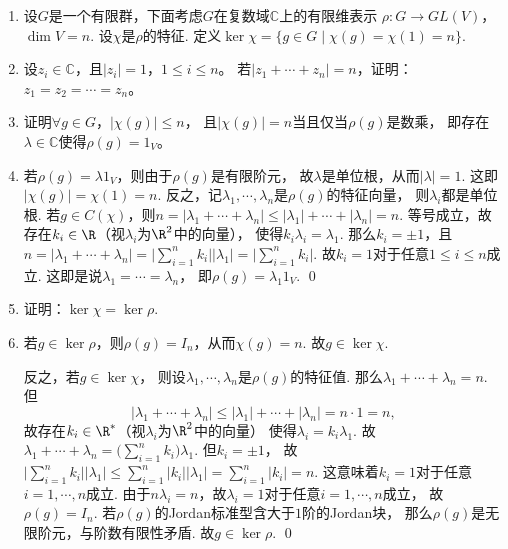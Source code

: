\begin{enumerate}
    \item[11.5] 设$G$是一个有限群，下面考虑$G$在复数域$\mathbb{C}$上的有限维表示
    $\rho:G \rightarrow GL(V)$，$\dim V = n$.
    设$\chi$是$\rho$的特征. 
    定义$\ker \chi = \{g \in G \mid \chi(g) = \chi(1) = n\}$.
    \item[(i)] 设$z_i\in\mathbb{C}$，且$|z_i|=1$，$1\le i\le n$。
        若$|z_1+\cdots+z_n|=n$，证明：$z_1=z_2=\cdots=z_n$。
    \item[(ii)] 证明$\forall g\in G$，$|\chi(g)|\le n$，
        且$|\chi(g)|=n$当且仅当$\rho(g)$是数乘，
        即存在$\lambda\in\mathbb{C}$使得$\rho(g)=1_V$。
    \item[\textbf{证明:}]
        若$\rho(g)=\lambda 1_{V}$，则由于$\rho(g)$是有限阶元，
        故$\lambda$是单位根，从而$|\lambda|=1$. 这即$|\chi(g)|=\chi(1)=n$.
        反之，记$\lambda_{1},\cdots,\lambda_{n}$是$\rho(g)$的特征向量，
        则$\lambda_{i}$都是单位根.
        若$g \in C(\chi)$，则$n = |\lambda_{1}+\cdots+\lambda_{n}|
        \leq |\lambda_{1}|+\cdots+|\lambda_{n}| = n$.
        等号成立，故存在$k_{i} \in \R$（视$\lambda_{i}$为$\R^{2}$中的向量），
        使得$k_{i}\lambda_{i}=\lambda_{1}$.
        那么$k_{i}=\pm 1$，且$n = |\lambda_{1}+\cdots+\lambda_{n}| 
        = \Big|\sum\limits_{i=1}^{n}k_{i}\Big||\lambda_{1}| 
        = \Big|\sum\limits_{i=1}^{n}k_{i}\Big|$.
        故$k_{i}=1$对于任意$1 \leq i \leq n$成立. 
        这即是说$\lambda_{1}=\cdots=\lambda_{n}$，
        即$\rho(g) = \lambda_{1}1_{V}$. \qed
    \item[(iii)] 证明：$\ker \chi = \ker \rho$.
    \item[\textbf{证明:}]
        若$g \in \ker\rho$，则$\rho(g)=I_{n}$，从而$\chi(g) = n$.
        故$g \in \ker\chi$.

        反之，若$g \in \ker\chi$，
        则设$\lambda_{1},\cdots,\lambda_{n}$是$\rho(g)$的特征值. 
        那么$\lambda_{1} + \cdots + \lambda_{n} = n$.
        但
        \[|\lambda_{1} + \cdots + \lambda_{n}| 
        \leq |\lambda_{1}| + \cdots + |\lambda_{n}| = n \cdot 1 = n,\]
        故存在$k_{i} \in \R^{*}$（视$\lambda_{i}$为$\R^{2}$中的向量）
        使得$\lambda_{i} = k_{i}\lambda_{1}$.
        故$\lambda_{1} + \cdots + \lambda_{n} 
        = \Big(\sum\limits_{i=1}^{n}k_{i}\Big)\lambda_{1}$.
        但$k_{i} = \pm 1$，
        故$\Big|\sum\limits_{i=1}^{n}k_{i}\Big||\lambda_{1}| 
        \leq \sum\limits_{i=1}^{n}|k_{i}||\lambda_{1}| 
        = \sum\limits_{i=1}^{n}|k_{i}| = n$. 
        这意味着$k_{i}=1$对于任意$i=1,\cdots,n$成立.
        由于$n \lambda_{i} = n$，故$\lambda_{i}=1$对于任意$i=1,\cdots,n$成立，
        故$\rho(g)=I_{n}$. 
        若$\rho(g)$的Jordan标准型含大于$1$阶的Jordan块，
        那么$\rho(g)$是无限阶元，与阶数有限性矛盾.
        故$g \in \ker \rho$. \qed


\end{enumerate}
